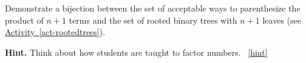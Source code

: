 \documentclass{book}
\begin{document}
\setcounter{project}{180}
\addtocounter{project}{-1}
\begin{activity}[]\label{activity-173}
\hypertarget{p-1058}{}%
Demonstrate a bijection between the set of acceptable ways to parenthesize the product of \(n+1\) terms and the set of rooted binary trees with \(n+1\) leaves (see \hyperref[act-rootedtrees]{Activity~\ref{act-rootedtrees}}).%
\par\smallskip%
\noindent\textbf{Hint.}\hypertarget{hint-120}{}\quad%
\hypertarget{p-1059}{}%
Think about how students are taught to factor numbers.%
~\hfill{\tiny\hyperlink{a-180}{[hint]}\hypertarget{q-180}{}}\end{activity}
\end{document}
